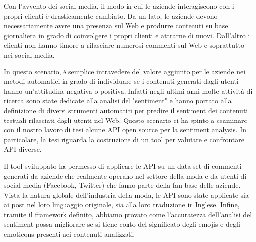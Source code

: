Con l'avvento dei social media, il modo in cui le aziende interagiscono con i propri clienti è drasticamente cambiato. Da un lato, le aziende devono necessariamente avere una presenza sul Web e produrre contenuti su base giornaliera in grado di coinvolgere i propri clienti e attrarne di nuovi. Dall'altro i clienti non hanno timore a rilasciare numerosi commenti sul Web e soprattutto nei social media.  

In questo scenario, è semplice intravedere del valore aggiunto per le aziende nei metodi automatici in grado di individuare se i contenuti generati dagli utenti hanno un'attitudine negativa o positiva. Infatti negli ultimi anni molte attività di ricerca sono state dedicate alla analisi del "sentiment" e hanno portato alla definizione di diversi strumenti automatici per predire il sentiment dei contenuti testuali rilasciati dagli utenti nel Web. Questo scenario ci ha spinto a esaminare con il nostro lavoro di tesi alcune API open source per la sentiment analysis. In particolare, la tesi riguarda la costruzione di un tool per valutare e confrontare API diverse.

Il tool sviluppato ha permesso di applicare le API su un data set di commenti generati da aziende che realmente operano nel settore della moda e da utenti di social media (Facebook, Twitter) che fanno parte della fan base delle aziende. Vista la natura globale dell'industria della moda, le API sono state applicate sia ai post nel loro linguaggio originale, sia alla loro traduzione in Inglese. Infine, tramite il framework definito, abbiamo provato come l'accuratezza dell'analisi del sentiment possa migliorare se si tiene conto del  significato degli emojis e degli emoticons presenti nei contenuti analizzati.
